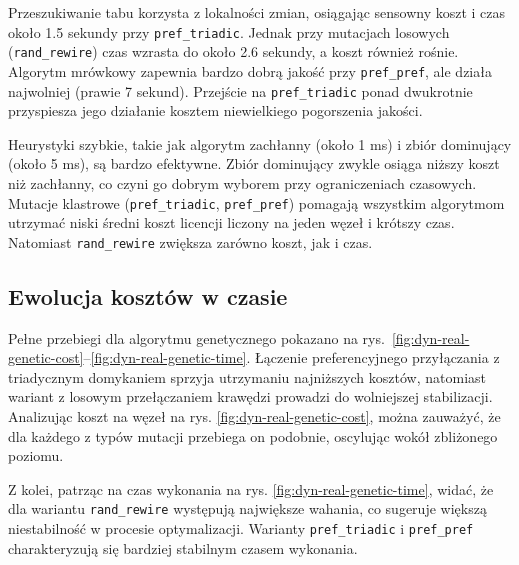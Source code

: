 Przeszukiwanie tabu korzysta z lokalności zmian, osiągając sensowny koszt i czas około 1.5 sekundy przy \texttt{pref\_triadic}. Jednak przy mutacjach losowych (\texttt{rand\_rewire}) czas wzrasta do około 2.6 sekundy, a koszt również rośnie. Algorytm mrówkowy zapewnia bardzo dobrą jakość przy \texttt{pref\_pref}, ale działa najwolniej (prawie 7 sekund). Przejście na \texttt{pref\_triadic} ponad dwukrotnie przyspiesza jego działanie kosztem niewielkiego pogorszenia jakości.

Heurystyki szybkie, takie jak algorytm zachłanny (około 1 ms) i zbiór dominujący (około 5 ms), są bardzo efektywne. Zbiór dominujący zwykle osiąga niższy koszt niż zachłanny, co czyni go dobrym wyborem przy ograniczeniach czasowych. Mutacje klastrowe (\texttt{pref\_triadic}, \texttt{pref\_pref}) pomagają wszystkim algorytmom utrzymać niski średni koszt licencji liczony na jeden węzeł i krótszy czas. Natomiast \texttt{rand\_rewire} zwiększa zarówno koszt, jak i czas.


\subsection{Ewolucja kosztów w czasie}
Pełne przebiegi dla algorytmu genetycznego pokazano na rys.~\ref{fig:dyn-real-genetic-cost}--\ref{fig:dyn-real-genetic-time}. Łączenie preferencyjnego przyłączania z triadycznym domykaniem sprzyja utrzymaniu najniższych kosztów, natomiast wariant z losowym przełączaniem krawędzi prowadzi do wolniejszej stabilizacji. Analizując koszt na węzeł na rys. \ref{fig:dyn-real-genetic-cost}, można zauważyć, że dla każdego z typów mutacji przebiega on podobnie, oscylując wokół zbliżonego poziomu.

Z kolei, patrząc na czas wykonania na rys. \ref{fig:dyn-real-genetic-time}, widać, że dla wariantu \texttt{rand\_rewire} występują największe wahania, co sugeruje większą niestabilność w procesie optymalizacji. Warianty \texttt{pref\_triadic} i \texttt{pref\_pref} charakteryzują się bardziej stabilnym czasem wykonania.

